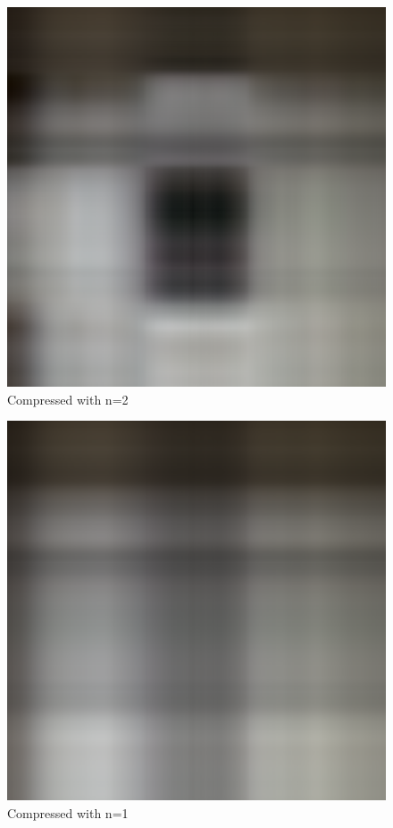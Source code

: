 \documentclass{article}
\begin{document}
\begin{figure}[h]
    \includegraphics[scale=0.15]{lokip.jpg_svdt2.png}
    \centering
    \caption{Compressed with n=2}
\end{figure}

\begin{figure}[h]
    \includegraphics[scale=0.15]{lokip.jpg_svdt1.png}
    \centering
    \caption{Compressed with n=1}
\end{figure}
\end{document}
